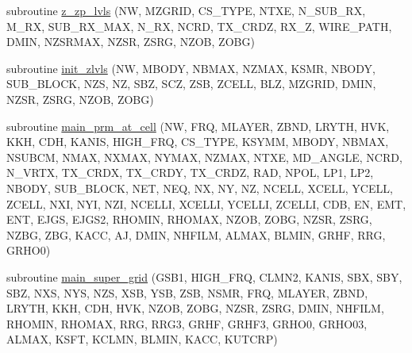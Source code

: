 \begin{DoxyCompactItemize}
\item 
subroutine \hyperlink{Marco_8f90_a957825940d4c1d1ff2eabfb92165404e}{z\+\_\+zp\+\_\+lvls} (NW, M\+Z\+G\+R\+ID, C\+S\+\_\+\+T\+Y\+PE, N\+T\+XE, N\+\_\+\+S\+U\+B\+\_\+\+RX, M\+\_\+\+RX, S\+U\+B\+\_\+\+R\+X\+\_\+\+M\+AX, N\+\_\+\+RX, N\+C\+RD, T\+X\+\_\+\+C\+R\+DZ, R\+X\+\_\+Z, W\+I\+R\+E\+\_\+\+P\+A\+TH, D\+M\+IN, N\+Z\+S\+R\+M\+AX, N\+Z\+SR, Z\+S\+RG, N\+Z\+OB, Z\+O\+BG)
\item 
subroutine \hyperlink{Marco_8f90_a4052ce4c8e8ce6ad657a5430196fb520}{init\+\_\+zlvls} (NW, M\+B\+O\+DY, N\+B\+M\+AX, N\+Z\+M\+AX, K\+S\+MR, N\+B\+O\+DY, S\+U\+B\+\_\+\+B\+L\+O\+CK, N\+ZS, NZ, S\+BZ, S\+CZ, Z\+SB, Z\+C\+E\+LL, B\+LZ, M\+Z\+G\+R\+ID, D\+M\+IN, N\+Z\+SR, Z\+S\+RG, N\+Z\+OB, Z\+O\+BG)
\item 
subroutine \hyperlink{Marco_8f90_a81389ef2893dbfd5d6a4c769758b1336}{main\+\_\+prm\+\_\+at\+\_\+cell} (NW, F\+RQ, M\+L\+A\+Y\+ER, Z\+B\+ND, L\+R\+Y\+TH, H\+VK, K\+KH, C\+DH, K\+A\+N\+IS, H\+I\+G\+H\+\_\+\+F\+RQ, C\+S\+\_\+\+T\+Y\+PE, K\+S\+Y\+MM, M\+B\+O\+DY, N\+B\+M\+AX, N\+S\+U\+B\+CM, N\+M\+AX, N\+X\+M\+AX, N\+Y\+M\+AX, N\+Z\+M\+AX, N\+T\+XE, M\+D\+\_\+\+A\+N\+G\+LE, N\+C\+RD, N\+\_\+\+V\+R\+TX, T\+X\+\_\+\+C\+R\+DX, T\+X\+\_\+\+C\+R\+DY, T\+X\+\_\+\+C\+R\+DZ, R\+AD, N\+P\+OL, L\+P1, L\+P2, N\+B\+O\+DY, S\+U\+B\+\_\+\+B\+L\+O\+CK, N\+ET, N\+EQ, NX, NY, NZ, N\+C\+E\+LL, X\+C\+E\+LL, Y\+C\+E\+LL, Z\+C\+E\+LL, N\+XI, N\+YI, N\+ZI, N\+C\+E\+L\+LI, X\+C\+E\+L\+LI, Y\+C\+E\+L\+LI, Z\+C\+E\+L\+LI, C\+DB, EN, E\+MT, E\+NT, E\+J\+GS, E\+J\+G\+S2, R\+H\+O\+M\+IN, R\+H\+O\+M\+AX, N\+Z\+OB, Z\+O\+BG, N\+Z\+SR, Z\+S\+RG, N\+Z\+BG, Z\+BG, K\+A\+CC, AJ, D\+M\+IN, N\+H\+F\+I\+LM, A\+L\+M\+AX, B\+L\+M\+IN, G\+R\+HF, R\+RG, G\+R\+H\+O0)
\item 
subroutine \hyperlink{Marco_8f90_ab4072d7c3398c241c49159b987685a55}{main\+\_\+super\+\_\+grid} (G\+S\+B1, H\+I\+G\+H\+\_\+\+F\+RQ, C\+L\+M\+N2, K\+A\+N\+IS, S\+BX, S\+BY, S\+BZ, N\+XS, N\+YS, N\+ZS, X\+SB, Y\+SB, Z\+SB, N\+S\+MR, F\+RQ, M\+L\+A\+Y\+ER, Z\+B\+ND, L\+R\+Y\+TH, K\+KH, C\+DH, H\+VK, N\+Z\+OB, Z\+O\+BG, N\+Z\+SR, Z\+S\+RG, D\+M\+IN, N\+H\+F\+I\+LM, R\+H\+O\+M\+IN, R\+H\+O\+M\+AX, R\+RG, R\+R\+G3, G\+R\+HF, G\+R\+H\+F3, G\+R\+H\+O0, G\+R\+H\+O03, A\+L\+M\+AX, K\+S\+FT, K\+C\+L\+MN, B\+L\+M\+IN, K\+A\+CC, K\+U\+T\+C\+RP)
\item 

\end{DoxyCompactItemize}
